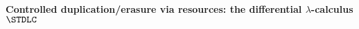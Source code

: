 \begin{comment}

\begin{figure*}

	\scriptsize
	
	\[ \arraycolsep=5pt\def\arraystretch{2.8}
	\begin{array}{cccc}
		\prooftree
		\Gamma \vdash M:A
		\justifies
		\Gamma, x:_{0}B \vdash M:A
		\endprooftree 
		&
		\prooftree
		\Gamma, x:_{n}B, y:_{m} B\vdash M:A
		\justifies
		\Gamma, x:_{n+m}B\vdash M\{x/y\}:A
		\endprooftree 
		&
		\prooftree
		\Gamma, x:_{n} A\vdash M: B
		\justifies
		\Gamma\vdash \lambda x.M: !_{n}A\multimap B
		\endprooftree
		&
		\prooftree
		\Gamma \vdash M: !_nA\multimap B
		\quad
		\Delta\vdash N: A
		\justifies
		\Gamma +n\Delta\vdash MN: B
		\endprooftree
		\\
		\\
		\hline
		\\
		\prooftree
		\Gamma, x: A\vdash M: B
		\justifies
		\Gamma\vdash \lambda x.M: A\to B
		\endprooftree 
		&
		\prooftree
		\Gamma \vdash M: A\to B
		\quad
		\Gamma\vdash \mathbb T: A
		\justifies
		\Gamma \vdash M\mathbb T: B
		\endprooftree 
		&
		\prooftree
		\Gamma \vdash M: A\to B
		\quad
		\Gamma \vdash N: A
		\justifies
		\Gamma \vdash \Diff{M}{N}: A\to B
		\endprooftree
		&
		\prooftree
		\Gamma\vdash M_1: A
		\,\cdots\,
		\Gamma \vdash M_n:A
		\justifies
		\Gamma \vdash M_1+\cdots +M_n : A
		\using (n\geq 2)
		\endprooftree
	\end{array}
	\]
	\caption{Typing rules (axiom rules are given in the text) for $\BSTLC$ (top) and $\STDLC$ (bottom).}\label{fig:rules}
\end{figure*}

\end{comment}

\paragraph*{Controlled duplication/erasure via resources: the differential $\lambda$-calculus $\STDLC$}\label{sec:STDLC}

